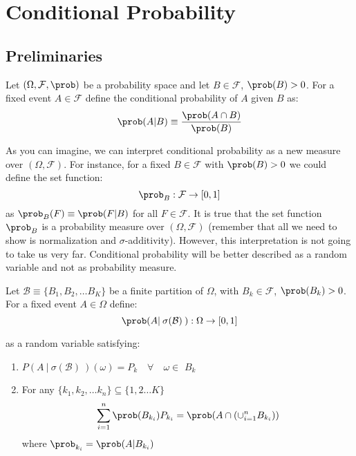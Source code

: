 \documentclass[11pt]{article} %
\begin{document}
\section{Conditional Probability}
\subsection{Preliminaries}
\begin{definition}  Let $(\Omega, \mathcal{F}, \prob)$ be a probability space and let $B \in \mathcal{F}$, $\prob(B)>0$. For a fixed event $A \in \mathcal{F}$ define the conditional probability of $A$ given $B$ as:
$$\prob(A | B) \equiv \frac{\prob(A \cap B)}{\prob(B)}  $$  
\end{definition} 

\noindent As you can imagine, we can interpret conditional probability as a new measure over $(\Omega, \mathcal{F})$. For instance, for a fixed $B \in \mathcal{F}$ with $\prob(B)>0$ we could define the set function:
$$\prob_{B}: \mathcal{F} \rightarrow [0,1] $$
\noindent as $\prob_{B}(F) \equiv \prob(F | B)$ for all $F \in \mathcal{F}$. It is true that the set function $\prob_{B}$ is a probability measure over $(\Omega, \mathcal{F})$ (remember that all we need to show is normalization and $\sigma$-additivity). However, this interpretation is not going to take us very far. Conditional probability will be better described as a random variable and not as probability measure.\

\begin{definition} Let $\mathcal{B} \equiv \{B_1, B_2, \ldots B_{K}\}$ be a finite partition of $\Omega$, with $B_{k} \in \mathcal{F}$, $\prob(B_k)>0$. For a fixed event $A \in \Omega$ define:
$$\prob(A | \: \sigma(\mathcal{B}) \: ): \Omega \rightarrow [0,1] $$ 
\end{definition}
\noindent as a random variable satisfying:
\begin{enumerate}
\item $P(A \: | \: \sigma(\mathcal{B})\: ) (\omega) = P_k \quad \forall \quad \omega \in$ $B_{k}$ 
\item For any $\{k_1, k_2, \ldots k_n\} \subseteq \{1,2 \ldots K\}$ 
$$\sum_{i=1}^{n} \prob(B_{k_i})P_{k_i} = \prob(A \cap (\cup_{i=1}^{n} B_{k_i}))  $$ 
where $\prob_{k_i}=\prob(A|B_{k_i})$
\end{enumerate}
\end{document}
